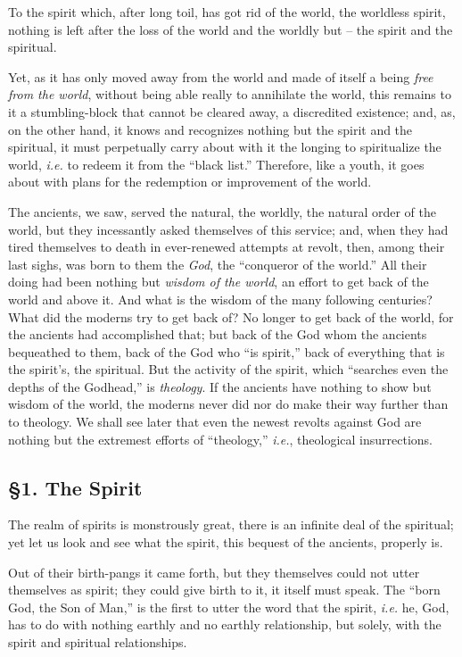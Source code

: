 \documentclass[12pt,a4paper]{book}
\begin{document}
To the spirit which, after long toil, has got rid of the world, the worldless 
spirit, nothing is left after the loss of the world and the worldly but -- the 
spirit and the spiritual.

Yet, as it has only moved away from the world and made of itself a being 
\textit{free from the world}, without being able really to annihilate the 
world, this remains to it a stumbling-block that cannot be cleared away, a 
discredited existence; and, as, on the other hand, it knows and recognizes 
nothing but the spirit and the spiritual, it must perpetually carry about with 
it the longing to spiritualize the world, \textit{i.e.} to redeem it from the 
``black list.'' Therefore, like a youth, it goes about with plans for the 
redemption or improvement of the world.

The ancients, we saw, served the natural, the worldly, the natural order of 
the world, but they incessantly asked themselves of this service; and, when 
they had tired themselves to death in ever-renewed attempts at revolt, then, 
among their last sighs, was born to them the \textit{God}, the ``conqueror of 
the world.'' All their doing had been nothing but \textit{wisdom of the 
world}, an effort to get back of the world and above it. And what is the 
wisdom of the many following centuries? What did the moderns try to get back 
of? No longer to get back of the world, for the ancients had accomplished 
that; but back of the God whom the ancients bequeathed to them, back of the 
God who ``is spirit,'' back of everything that is the spirit's, the 
spiritual. But the activity of the spirit, which ``searches even the depths 
of the Godhead,'' is \textit{theology}. If the ancients have nothing to show 
but wisdom of the world, the moderns never did nor do make their way further 
than to theology. We shall see later that even the newest revolts against God 
are nothing but the extremest efforts of ``theology,'' \textit{i.e.}, 
theological insurrections.

\subsection[\S{}1. The Spirit]{\centering \S{}1. The Spirit}

The realm of spirits is monstrously great, there is an infinite deal of the 
spiritual; yet let us look and see what the spirit, this bequest of the 
ancients, properly is.

Out of their birth-pangs it came forth, but they themselves could not utter 
themselves as spirit; they could give birth to it, it itself must speak. The 
``born God, the Son of Man,'' is the first to utter the word that the 
spirit, \textit{i.e.} he, God, has to do with nothing earthly and no earthly 
relationship, but solely, with the spirit and spiritual relationships.
\end{document}
